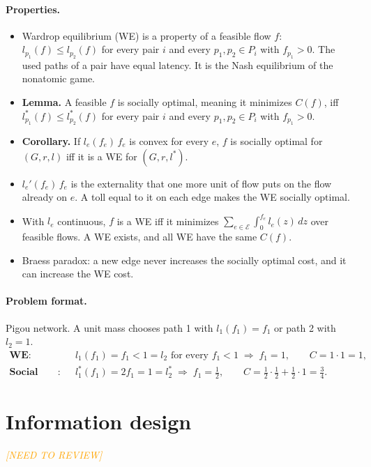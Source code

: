 \documentclass{article}
\newcommand{\todo}[1]{\textit{\textcolor{orange}{ [#1]}}}
\newcommand{\res}[1]{\textbf{#1.}}
\begin{document}
\paragraph{Properties.}
\begin{itemize}
    \item Wardrop equilibrium (WE) is a property of a feasible flow $f$: $l_{p_1}(f)\le l_{p_2}(f)$ for every pair $i$ and every $p_1,p_2\in P_i$ with $f_{p_1}>0$. The used paths of a pair have equal latency. It is the Nash equilibrium of the nonatomic game.
    \item \res{Lemma} A feasible $f$ is socially optimal, meaning it minimizes $C(f)$, iff $l_{p_1}^*(f)\le l_{p_2}^*(f)$ for every pair $i$ and every $p_1,p_2\in P_i$ with $f_{p_1}>0$.
    \item \res{Corollary} If $l_e(f_e)\,f_e$ is convex for every $e$, $f$ is socially optimal for $(G,r,l)$ iff it is a WE for $(G,r,l^*)$.
    \item $l_e'(f_e)\,f_e$ is the externality that one more unit of flow puts on the flow already on $e$. A toll equal to it on each edge makes the WE socially optimal.
    \item With $l_e$ continuous, $f$ is a WE iff it minimizes $\sum_{e\in\mathcal E}\int_0^{f_e}l_e(z)\,dz$ over feasible flows. A WE exists, and all WE have the same $C(f)$.
    \item Braess paradox: a new edge never increases the socially optimal cost, and it can increase the WE cost.
\end{itemize}

\paragraph{Problem format.}
Pigou network. A unit mass chooses path 1 with $l_1(f_1)=f_1$ or path 2 with $l_2=1$.
\begin{align*}
    \textbf{WE}:&\quad l_1(f_1)=f_1<1=l_2\text{ for every }f_1<1\;\Rightarrow\;f_1=1,\qquad C=1\cdot 1=1,\\
    \textbf{Social optimum}:&\quad l_1^*(f_1)=2f_1=1=l_2^*\;\Rightarrow\;f_1=\tfrac12,\qquad C=\tfrac12\cdot\tfrac12+\tfrac12\cdot 1=\tfrac34.
\end{align*}

\section{Information design}
\todo{NEED TO REVIEW}
\end{document}
